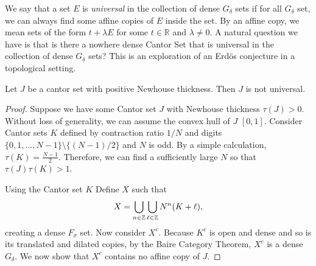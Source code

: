 
We  say that a set $E$ is  {\it universal} in the collection of dense $G_{\delta}$ sets if for all $G_{\delta}$ set,  we can  always find some affine copies of $E$ inside the set. By an affine copy, we  mean sets of  the form $t+\lambda E$ for some $t\in{\mathbb R}$ and $\lambda\ne 0$. A natural question we have is that  is there a nowhere dense Cantor Set that is universal in the collection of dense $G_\delta$ sets? This is an exploration of an Erd\"{o}s conjecture in a topological setting. 

\begin{theorem}\label{theorem_positive_NW}
Let $J$ be a cantor set with positive Newhouse thickness.  Then $J$ is not universal.
\end{theorem}

\begin{proof} Suppose we have some Cantor set $J$ with Newhouse thickness $\tau(J) >0$. Without loss of generality, we  can assume  the convex hull of $J$ $[0,1]$.   Consider Cantor sets $K$ defined by contraction ratio $1/N$ and digits $\{0,1,...,N-1\}\setminus\{(N-1)/2\}$ and $N$ is odd. By a simple calculation,  $\tau (K) = \frac{N-1}{2}$. Therefore,  we can find a  sufficiently large $N$ so that $\tau(J)\tau(K)>1$. 

\medskip

Using the Cantor set $K$ Define $X$ such that 
$$
X = \bigcup_{n \in \mathbb{Z}} \bigcup_{\ell \in \mathbb{Z}} N^n(K+\ell),
$$
creating a dense $F_\sigma$ set. Now consider $X^c$.  Because $K^c$ is open and dense and so is its translated and dilated copies, by the Baire Category Theorem, $X^c$ is a dense $G_{\delta}$.  We now show that $X^c$ contains no affine copy of $J$. 

\medskip


\end{proof}
